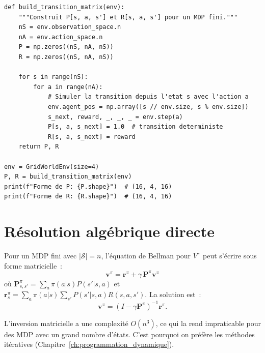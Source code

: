 \begin{codeblock}[title=\textbf{Construction de la matrice de transition}]
\begin{verbatim}
def build_transition_matrix(env):
    """Construit P[s, a, s'] et R[s, a, s'] pour un MDP fini."""
    nS = env.observation_space.n
    nA = env.action_space.n
    P = np.zeros((nS, nA, nS))
    R = np.zeros((nS, nA, nS))

    for s in range(nS):
        for a in range(nA):
            # Simuler la transition depuis l'etat s avec l'action a
            env.agent_pos = np.array([s // env.size, s % env.size])
            s_next, reward, _, _, _ = env.step(a)
            P[s, a, s_next] = 1.0  # transition deterministe
            R[s, a, s_next] = reward
    return P, R

env = GridWorldEnv(size=4)
P, R = build_transition_matrix(env)
print(f"Forme de P: {P.shape}")  # (16, 4, 16)
print(f"Forme de R: {R.shape}")  # (16, 4, 16)
\end{verbatim}
\end{codeblock}

\section{R\'esolution alg\'ebrique directe}

\begin{proposition}
Pour un MDP fini avec $|\mathcal{S}| = n$, l'\'equation de Bellman pour $V^\pi$
peut s'\'ecrire sous forme matricielle~:
\[
    \mathbf{v}^\pi = \mathbf{r}^\pi + \gamma \, \mathbf{P}^\pi \mathbf{v}^\pi
\]
o\`u $\mathbf{P}^\pi_{s,s'} = \sum_a \pi(a|s) P(s'|s,a)$ et
$\mathbf{r}^\pi_s = \sum_a \pi(a|s) \sum_{s'} P(s'|s,a) R(s,a,s')$.
La solution est~:
\[
    \mathbf{v}^\pi = (I - \gamma \mathbf{P}^\pi)^{-1} \mathbf{r}^\pi.
\]
\end{proposition}

\begin{attention}[title=\textbf{Complexit\'e de la r\'esolution directe}]
L'inversion matricielle a une complexit\'e $O(n^3)$, ce qui la rend impraticable
pour des MDP avec un grand nombre d'\'etats. C'est pourquoi on pr\'ef\`ere les
m\'ethodes it\'eratives (Chapitre~\ref{ch:programmation_dynamique}).
\end{attention}

